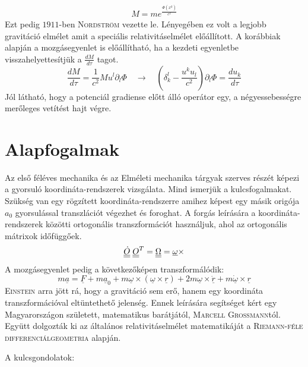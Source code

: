 \documentclass[a4paper,12pt]{article}
\def\doubleunderline#1{\underline{\underline{#1}}}
\begin{document}
\begin{align*}
M = m e^{\frac{\Phi(x^{k})}{c^{2}}}
\end{align*}
Ezt pedig $1911$-ben \textsc{Nordström} vezette le. Lényegében ez volt a legjobb gravitáció elmélet amit a speciális relativitáselmélet előállított. A korábbiak alapján a mozgásegyenlet is előállítható, ha a kezdeti egyenletbe visszahelyettesítjük a $\frac{dM}{d\tau}$ tagot.
\begin{equation*}
\frac{dM}{d\tau} = \frac{1}{c^{2}}Mu^{l}\partial_{l}\Phi \quad \rightarrow \quad (\delta^{l}_{k} - \frac{u^{k}u_{l}}{c^{2}})\partial_{l}\Phi = \frac{du_{k}}{d\tau}
\end{equation*}
Jól látható, hogy a potenciál gradiense előtt álló operátor egy, a négyessebességre merőleges vetítést hajt végre.
\section{ Alapfogalmak}
\hspace{0.5cm} Az első féléves mechanika és az Elméleti mechanika tárgyak szerves részét képezi a gyorsuló koordináta-rendszerek vizsgálata. Mind ismerjük a kulcsfogalmakat. Szükség van egy rögzített koordináta-rendszerre amihez képest egy másik origója $a_{0}$ gyorsulással transzlációt végezhet és foroghat. A forgás leírására a koordináta-rendszerek közötti ortogonális transzformációt használjuk, ahol az ortogonális mátrixok időfüggőek.
\begin{equation*}
\doubleunderline{\dot{O}}\hspace{0.1cm}\doubleunderline{O}^{T} = \doubleunderline{\Omega} = \underline{\omega} \times
\end{equation*}
A mozgásegyenlet pedig a következőképen transzformálódik:
\begin{equation*}
m\underline{a} = \underline{F} + m\underline{a}_{0} + m \underline{\omega} \times (\underline{\omega} \times \underline{r}) + 2m\underline{\omega}\times\underline{\dot{r}} + m \underline{\dot{\omega}}\times \underline{r}
\end{equation*}
\textsc{Einstein} arra jött rá, hogy a gravitáció sem erő, hanem egy koordináta transzformációval eltüntethető jelenség. Ennek leírására segítséget kért egy Magyarországon született, matematikus barátjától, \textsc{Marcell Grossmann}tól. Együtt dolgozták ki az általános relativitáselmélet matematikáját a \textsc{Riemann-féle differenciálgeometria} alapján. \newline
\par A kulcsgondolatok:
\end{document}
